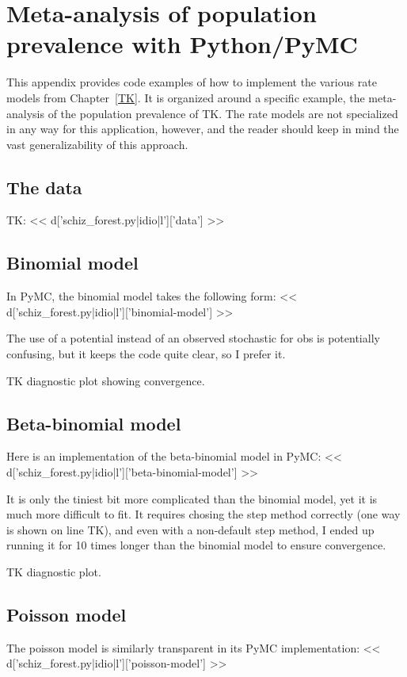 \section{Meta-analysis of population prevalence with Python/PyMC}

This appendix provides code examples of how to implement the various
rate models from Chapter~\ref{TK}.  It is organized around a specific
example, the meta-analysis of the population prevalence of TK.  The
rate models are not specialized in any way for this application,
however, and the reader should keep in mind the vast generalizability
of this approach.

\subsection{The data}
TK:
<< d['schiz_forest.py|idio|l']['data'] >>

\subsection{Binomial model}
In PyMC, the binomial model takes the following form:
<< d['schiz_forest.py|idio|l']['binomial-model'] >>

The use of a potential instead of an observed stochastic for obs is potentially
confusing, but it keeps the code quite clear, so I prefer it.

TK diagnostic plot showing convergence.

\subsection{Beta-binomial model}
Here is an implementation of the beta-binomial model in PyMC:
<< d['schiz_forest.py|idio|l']['beta-binomial-model'] >>

It is only the tiniest bit more complicated than the binomial model,
yet it is much more difficult to fit.  It requires chosing the step
method correctly (one way is shown on line TK), and even with a
non-default step method, I ended up running it for 10 times longer
than the binomial model to ensure convergence.

TK diagnostic plot.

\subsection{Poisson model}
The poisson model is similarly transparent in its PyMC implementation:
<< d['schiz_forest.py|idio|l']['poisson-model'] >>


